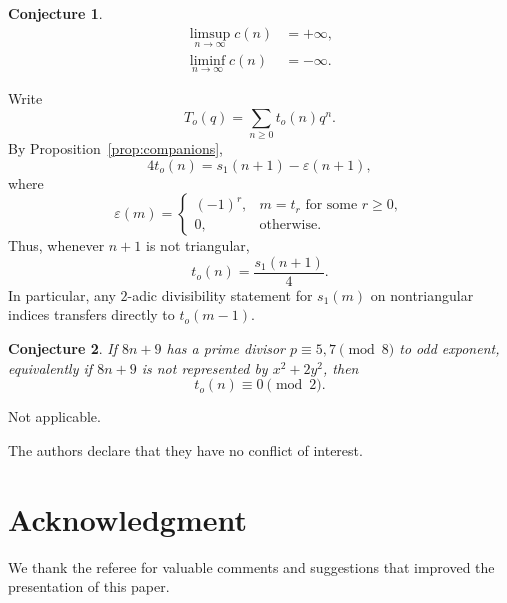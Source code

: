 \documentclass[reqno]{amsart}
\theoremstyle{plain}
\newtheorem{conjecture}{Conjecture}
\theoremstyle{definition}
\theoremstyle{remark}
\numberwithin{equation}{section}
\newcommand{\trinum}[1]{t_{#1}}
\begin{document}
\begin{conjecture}
\begin{align}
\limsup_{n\to\infty}c(n)&=+\infty, \label{limsup} \\
\liminf_{n\to\infty}c(n)& =-\infty. \label{liminf}
\end{align}
\end{conjecture}

Write
\[
T_o(q)=\sum_{n\ge 0} t_o(n)q^n.
\]
By Proposition~\ref{prop:companions},
\[
4t_o(n)=s_1(n+1)-\varepsilon(n+1),
\]
where
\[
\varepsilon(m)=
\begin{cases}
(-1)^r,& m=\trinum{r}\text{ for some }r\ge 0,\\
0,& \text{otherwise.}
\end{cases}
\]
Thus, whenever $n+1$ is not triangular,
\[
t_o(n)=\frac{s_1(n+1)}{4}.
\]
In particular, any $2$-adic divisibility statement for $s_1(m)$ on nontriangular indices transfers directly to $t_o(m-1)$.

\begin{conjecture}\label{conj:T-parity}
If $8n+9$ has a prime divisor $p\equiv 5,7\pmod{8}$ to odd exponent, equivalently if $8n+9$ is not represented by $x^2+2y^2$, then
\[
t_o(n)\equiv 0\pmod{2}.
\]
\end{conjecture}

Not applicable.

\bigskip

The authors declare that they have no conflict of interest.


\section*{Acknowledgment}
We thank the referee for valuable comments and suggestions that improved the presentation of this paper.
\end{document}
